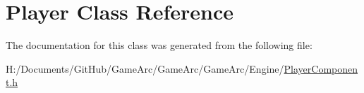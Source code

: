 \hypertarget{class_player}{\section{Player Class Reference}
\label{class_player}
}


The documentation for this class was generated from the following file\+:\begin{DoxyCompactItemize}
\item 
H\+:/\+Documents/\+Git\+Hub/\+Game\+Arc/\+Game\+Arc/\+Game\+Arc/\+Engine/\hyperlink{_player_component_8h}{Player\+Component.\+h}\end{DoxyCompactItemize}
